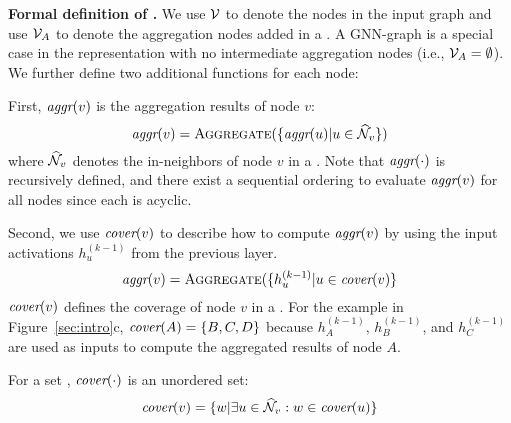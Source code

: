 
{\bf Formal definition of \xgs.}
We use $\mathcal{V}$ to denote the nodes in the input graph and use $\mathcal{V}_A$ to denote the aggregation nodes added in a \xg.
A GNN-graph is a special case in the \xg representation with no intermediate aggregation nodes (i.e., $\mathcal{V}_A = \emptyset$). 
We further define two additional functions for each node:

First, $\mbox{\rm\em aggr}(v)$ is the aggregation results of node $v$:
$$
\er{aggr}(v) = \textproc{Aggregate}(\{\er{aggr}(u) | u \in \mw{N}_v\})
$$
where $\mathcal{\widehat{N}}_v$ denotes the in-neighbors of node $v$ in a \xg.
Note that $\mbox{\rm\em aggr}(\cdot)$ is recursively defined, and there exist a sequential ordering to evaluate $\mbox{\rm\em aggr}(v)$ for all nodes since each \xg is acyclic.


Second, we use $\mbox{\rm\em cover}(v)$ to describe how to compute $\mbox{\rm\em aggr}(v)$ by using the input activations $h^{(k-1)}_u$ from the previous layer.
\begin{equation}
\er{aggr}(v) = \textproc{Aggregate}(\{h^{(k-1)}_u | u \in \er{cover}(v)\}
\end{equation}
$\mbox{\rm\em cover}(v)$ defines the coverage of node $v$ in a \xg. For the \xg example in Figure~\ref{sec:intro}c, $\mbox{\rm\em cover}(A) =  \{B, C, D\}$ because $h^{(k-1)}_A$, $h^{(k-1)}_B$, and $h^{(k-1)}_C$ are used as inputs to compute the aggregated results of node $A$.

For a set , $\mbox{\rm\em cover}(\cdot)$ is an unordered set: %
\begin{equation}
\label{eqn1}
\mbox{\rm\em cover}(v) = \{w | \exists u \in \mathcal{\widehat{N}}_v: w \in \mbox{\rm\em cover}(u)\}
\end{equation}

